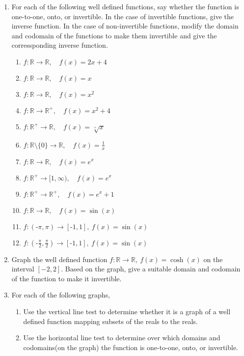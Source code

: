 \documentclass[11pt,a4paper,titlepage,oneside,openany]{article}
\numberwithin{equation}{section}
\numberwithin{algorithm}{section}
\numberwithin{figure}{section}
\numberwithin{table}{section}
\newcommand{\mb}{\mathbb}
\begin{document}
\begin{enumerate}
\item
  For each of the following well defined functions, say whether the function is one-to-one, onto, or invertible. In the case of invertible functions, give the inverse function. In the case of non-invertible functions, modify the domain and codomain of the functions to make them invertible and give the corressponding inverse function.
  \begin{multicols}{2}
    \begin{enumerate}
    \item $f: \mb{R} \to \mb{R},\quad f(x)=2x+4$
    \item $f: \mb{R} \to \mb{R},\quad f(x)=x$
    \item $f: \mb{R} \to \mb{R},\quad f(x)=x^2$
    \item $f: \mb{R} \to \mb{R}^+,\quad f(x)=x^2+4$
    \item $f: \mb{R}^+ \to \mb{R},\quad f(x)=\sqrt[+]{x}$
    \item $f: \mb{R}\setminus\{0\} \to \mb{R},\quad f(x)=\frac{1}{x}$
    \item $f: \mb{R} \to \mb{R},\quad f(x)=e^x$
    \item $f: \mb{R}^+ \to [1,\infty),\quad f(x)=e^x$
    \item $f: \mb{R}^+ \to \mb{R}^+,\quad f(x)=e^x+1$
    \item $f: \mb{R} \to \mb{R},\quad f(x)=\sin(x)$
    \item $f: (\text{-}\pi,\pi) \to [\text{-}1,1],\  f(x)=\sin(x)$
    \item $f: (\text{-}\frac{\pi}{2},\frac{\pi}{2}) \to [\text{-}1,1],\  f(x)=\sin(x)$
    \end{enumerate}
  \end{multicols}

\item
  Graph the well defined function $f: \mb{R} \to \mb{R}, \ f(x)=\cosh(x)$ on the interval $[-2,2]$. Based on the graph, give a suitable domain and codomain of the function to make it invertible.

\pagebreak

\item For each of the following graphs,
  \begin{enumerate}
    \item  Use the vertical line test to determine whether it is a graph of a well defined function mapping subsets of the reals to the reals.
    \item  Use the horizontal line test to determine over which domains and codomains(on the graph) the function is one-to-one, onto, or invertible.
  \end{enumerate}



\end{enumerate}
\end{document}
